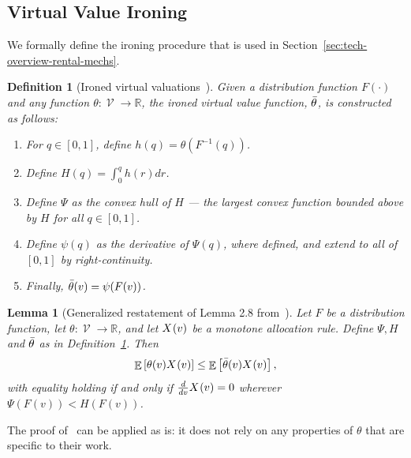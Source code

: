 \documentclass[11pt,letterpaper]{article}
\newcommand{\sqbr}[1]{\left[ #1 \right]}
\newcommand{\brackets}[1]{\left( #1 \right)}
\newcommand{\reals}{\mathbb{R}}
\DeclareMathOperator*{\E}{\bb{E}}
\newcommand{\bb}[1]{\mathbb{#1}}
\DeclareMathOperator{\V}{\mathcal{V}}
\theoremstyle{plain}
\newtheorem{lemma}[theorem]{Lemma}
\newtheorem{definition}{Definition}
\begin{document}
\subsection{Virtual Value Ironing}
\label{sec:ironing}

We formally define the ironing procedure that is used in Section~\ref{sec:tech-overview-rental-mechs}.

    \begin{definition}[Ironed virtual valuations~\cite{myerson1981optimal,HartlineR08}]\label{def:ironing}
    Given a distribution function $F(\cdot)$ and any function $\theta:\V\rightarrow\reals$, the \textnormal{ironed virtual value function}, $\Bar{\theta}$, is constructed as follows:

    \begin{enumerate}
        \item For $q\in[0,1]$, define $h(q)=\theta\brackets{F^{-1}(q)}$.
        \item Define $H(q)=\int_0^q h(r)dr$.
        \item Define $\Psi$ as the convex hull of $H$ --- the largest convex function bounded above by $H$ for all $q\in[0,1]$.
        \item Define $\psi(q)$ as the derivative of $\Psi(q)$, where defined, and extend to all of $[0,1]$ by right-continuity.
        \item Finally, $\Bar{\theta}(v)=\psi(F(v))$.
    \end{enumerate}
    \end{definition}
\begin{lemma}[Generalized restatement of Lemma 2.8 from~\cite{HartlineR08}]\label{lemma:ironing-properties}
    Let $F$ be a distribution function, let $\theta:\V\rightarrow\reals$, and let $\x{v}$ be a monotone allocation rule. 
    Define $\Psi,H$ and $\Bar{\theta}$ as in Definition~\ref{def:ironing}.
    Then 
    \begin{equation}
        \E\sqbr{\theta(v)\x{v}}\leq \E\sqbr{\Bar{\theta}(v)\x{v}},
    \end{equation}
    with equality holding if and only if $\frac{d}{d v}\x{v}=0$ wherever $\Psi(F(v))<H(F(v))$.
\end{lemma}

The proof of~\cite{HartlineR08} can be applied as is: it does not rely on any properties of $\theta$ that are specific to their work.
\end{document}
